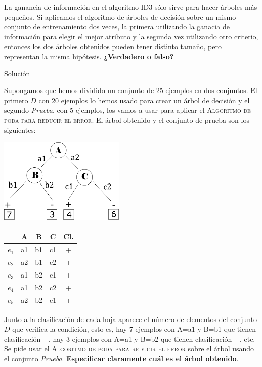 \documentclass{mulcia_aa}
\begin{document}
\begin{question}
La ganancia de información en el algoritmo ID3 sólo sirve para hacer árboles más pequeños. Si aplicamos el algoritmo de árboles de decisión sobre un mismo conjunto de entrenamiento dos veces, la primera utilizando la ganacia de información para elegir el mejor atributo y la segunda vez utilizando otro criterio, entonces los dos árboles obtenidos pueden tener distinto tamaño, pero representan la misma hipótesis. \textbf{¿Verdadero o falso?}
\end{question}
\begin{solution}
Solución
\end{solution}

\begin{problem}
Supongamos que hemos dividido un conjunto de 25 ejemplos en dos conjuntos. El primero $D$ con 20 ejemplos lo hemos usado para crear un árbol de decisión y el segundo \emph{Prueba}, con 5 ejemplos, los vamos a usar para aplicar el \textsc{Algoritmo de poda para reducir el error}. El árbol obtenido y el conjunto de prueba son los siguientes:\\

{\centering
\begin{minipage}{0.45\textwidth}
   \centering
\includegraphics[width=60mm]{arbol-c3.pdf}
\end{minipage}
\begin{minipage}{0.45\textwidth}
   \centering
\begin{tabular}{|c|c|c|c|c|}
\hline
\textit{} & \textbf{A} & B  & C  & Cl. \\ \hline
$e_1$      & a1         & b1 & c1 & +   \\ \hline
$e_2$      & a2         & b1 & c2 & +   \\ \hline
$e_3$      & a1         & b2 & c1 & +   \\ \hline
$e_4$      & a1         & b2 & c2 & +   \\ \hline
$e_5$      & a2         & b2 & c1 & +   \\ \hline
\end{tabular}
\end{minipage}
}

\begin{flushleft}
Junto a la clasificación de cada hoja aparece el número de elementos del conjunto $D$ que verifica la condición, esto es, hay 7 ejemplos con A=a1 y B=b1 que tienen clasificación $+$, hay 3 ejemplos con A=a1 y B=b2 que tienen clasificación $-$, etc. Se pide usar el \textsc{Algoritmo de poda para reducir el error} sobre el árbol usando el conjunto \emph{Prueba}. \textbf{Especificar claramente cuál es el árbol obtenido}.
\end{flushleft}
\end{problem}
\end{document}
